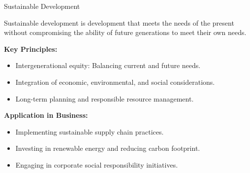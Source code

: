 \documentclass[aspectratio=169, 10pt]{beamer}
\begin{document}
\begin{frame}{Sustainable Development}

\begin{tcolorbox}[colback=WHUblue!5!white, colframe=WHUblue, title=Definition, fonttitle=\bfseries, sharp corners=south]
Sustainable development is development that meets the needs of the present without compromising the ability of future generations to meet their own needs.
\end{tcolorbox}

\vspace{1em}

\textbf{Key Principles:}
\begin{itemize}
  \item Intergenerational equity: Balancing current and future needs.
  \item Integration of economic, environmental, and social considerations.
  \item Long-term planning and responsible resource management.
\end{itemize}

\vspace{1em}

\textbf{Application in Business:}
\begin{itemize}
  \item Implementing sustainable supply chain practices.
  \item Investing in renewable energy and reducing carbon footprint.
  \item Engaging in corporate social responsibility initiatives.
\end{itemize}
\end{frame}
\end{document}
